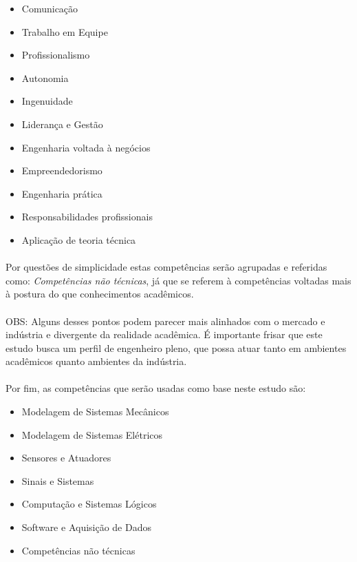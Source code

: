 \documentclass[12pt]{article} %
\begin{document}
\begin{itemize}
\setlength\itemsep{0.01mm}
\item Comunicação
\item Trabalho em Equipe
\item  Profissionalismo
\item Autonomia
\item Ingenuidade
\item Liderança e Gestão
\item Engenharia voltada à negócios
\item Empreendedorismo
\item Engenharia prática
\item Responsabilidades profissionais
\item Aplicação de teoria técnica
\end{itemize}

\paragraph{}Por questões de simplicidade estas competências serão agrupadas e referidas como: \textit{Competências não técnicas}, já que se referem à competências voltadas mais à postura do que conhecimentos acadêmicos.

\paragraph{}OBS: Alguns desses pontos podem parecer mais alinhados com o mercado e indústria e divergente da realidade acadêmica. É importante frisar que este estudo busca um perfil de engenheiro pleno, que possa atuar tanto em ambientes acadêmicos quanto ambientes da indústria.

\paragraph{}Por fim, as competências que serão usadas como base neste estudo são:

\begin{itemize}
\setlength\itemsep{0.01mm}
\item Modelagem de Sistemas Mecânicos
\item Modelagem de Sistemas Elétricos
\item Sensores e Atuadores
\item Sinais e Sistemas
\item Computação e Sistemas Lógicos
\item Software e Aquisição de Dados
\item Competências não técnicas
\end{itemize}
\end{document}
